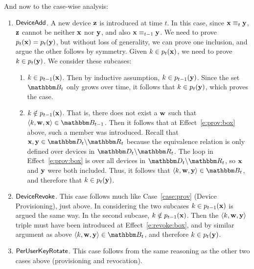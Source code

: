 And now to the case-wise analysis:
\begin{enumerate}
\item $\mathsf{DeviceAdd}{}$.
  \label{case:prov}
  A new device $\mathbf{z}$ is introduced at time $t$. In this case, since $\mathbf{x} \equiv_{t}
  \mathbf{y}$, $\mathbf{z}$ cannot be neither $\mathbf{x}$ nor $\mathbf{y}$, and also $\mathbf{x} \equiv_{t-1}
  \mathbf{y}$.  
  We need to prove $p_{t}(\mathbf{x}) = p_{t}(\mathbf{y})$, but without loss of generality, we can prove one
  inclusion, and argue the other follows by symmetry. Given ${k} \in p_{t}(\mathbf{x})$, we need to
  prove ${k} \in p_{t}(\mathbf{y})$.  We consider these subcases:
  \begin{enumerate}
  \item ${k} \in p_{t-1}(\mathbf{x})$. Then by inductive assumption, ${k} \in
    p_{t-1}(\mathbf{y})$. Since the set $\zset{b}_t$ only grows over time, it follows that ${k} \in
    p_{t}(\mathbf{y})$, which proves the case.
  \item ${k} \notin p_{t-1}(\mathbf{x})$. That is, there does not exist a $\mathbf{w}$ such that
    $\langle \zkey{k}, \zdev{w}, \zdev{x} \rangle \in \zset{b}_{t-1}$. Then it follows that at
    Effect~\ref{e:prov:box} above, such a member was introduced. Recall that $\zdev{x}, \zdev{y} \in
    \zactive{t}$ because the equivalence relation is only defined over devices in $\zactive{t}$. The
    loop in Effect~\ref{e:prov:box} is over all devices in $\zactive{t}$, so $\mathbf{x}$ and
    $\mathbf{y}$ were both included. Thus, it follows that $\langle \zkey{k}, \zdev{w}, \zdev{y}
    \rangle \in \zset{b}_t$, and therefore that ${k} \in p_{t}(\mathbf{y})$.
  \end{enumerate}

\item $\mathsf{DeviceRevoke}{}$. This case follows much like Case~\ref{case:prov} (Device Provisioning),
  just above. In considering the two subcases ${k} \in p_{t-1}(\mathbf{x})$ is argued the same way.
  In the second subcase, ${k} \notin p_{t-1}(\mathbf{x})$. Then the $\langle {k}, \mathbf{w},
  \mathbf{y} \rangle$ triple must have been introduced at Effect~\ref{e:revoke:box}, and by similar
  argument as above $\langle \zkey{k}, \zdev{w}, \zdev{y} \rangle \in \zset{b}_t$, and therefore
  ${k} \in p_{t}(\mathbf{y})$.

\item $\mathsf{PerUserKeyRotate}{}$. This case follows from the same reasoning as the other two cases above
  (provisioning and revocation).


\end{enumerate}
